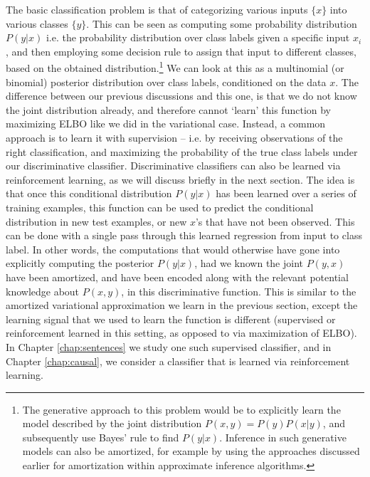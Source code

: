 The basic classification problem is that of categorizing various inputs $\{x\}$ into various classes $\{y\}$. This can be seen as computing some probability distribution $P(y | x)$ i.e. the probability distribution over class labels given a specific input $x_i$, and then employing some decision rule to assign that input to different classes, based on the obtained distribution.\footnote{The generative approach to this problem would be to explicitly learn the model described by the joint distribution $P(x, y) = P(y) P(x | y)$, and subsequently use Bayes' rule to find $P(y | x)$.  Inference in such generative models can also be amortized, for example by using the approaches discussed earlier for amortization within approximate inference algorithms.} We can look at this as a multinomial (or binomial) posterior distribution over class labels, conditioned on the data $x$. The difference between our previous discussions and this one, is that we do not know the joint distribution already, and therefore cannot `learn' this function by maximizing ELBO like we did in the variational case. Instead, a common approach is to learn it with supervision -- i.e. by receiving observations of the right classification, and maximizing the probability of the true class labels under our discriminative classifier. Discriminative classifiers can also be learned via reinforcement learning, as we will discuss briefly in the next section. The idea is that once this conditional distribution $P(y | x)$ has been learned over a series of training examples, this function can be used to predict the conditional distribution in new test examples, or new $x$'s that have not been observed. This can be done with a single pass through this learned regression from input to class label. In other words, the computations that would otherwise have gone into explicitly computing the posterior $P(y | x)$, had we known the joint $P(y,x)$ have been amortized, and have been encoded along with the relevant potential knowledge about $P(x,y)$, in this discriminative function. This is similar to the amortized variational approximation we learn in the previous section, except the learning signal that we used to learn the function is different (supervised or reinforcement learned in this setting, as opposed to via maximization of ELBO). In Chapter \ref{chap:sentences} we study one such supervised classifier, and in Chapter \ref{chap:causal}, we consider a classifier that is learned via reinforcement learning.

